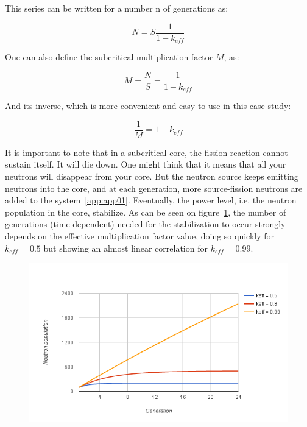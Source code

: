 This series can be written for a number n of generations as:

\begin{equation}\label{eq3}
N = S \frac{1}{1-k_{eff}}
\end{equation}

One can also define the subcritical multiplication factor $M$, as:

\begin{equation}\label{eq4}
M = \frac{N}{S} = \frac{1}{1-k_{eff}}
\end{equation}

And its inverse, which is more convenient and easy to use in this case study:

\begin{equation}\label{eq5}
\frac{1}{M} = 1-k_{eff}
\end{equation}

It is important to note that in a subcritical core, the fission reaction cannot sustain itself. It will die down. One might think that it means that all your neutrons will disappear from your core. But the neutron source keeps emitting neutrons into the core, and at each generation, more source-fission neutrons are added to the system~\ref{app:app01}. Eventually, the power level, i.e. the neutron population in the core, stabilize. As can be seen on figure~\ref{fig:neupop}, the number of generations (time-dependent) needed for the stabilization to occur strongly depends on the effective multiplication factor value, doing so quickly for $k_{eff} = 0.5$ but showing an almost linear correlation for $k_{eff} = 0.99$.

\begin{figure}[t!]
	\centering
	\includegraphics[height=0.4\textheight]{fig01/neupop.png}
	\label{fig:neupop}
\end{figure}

